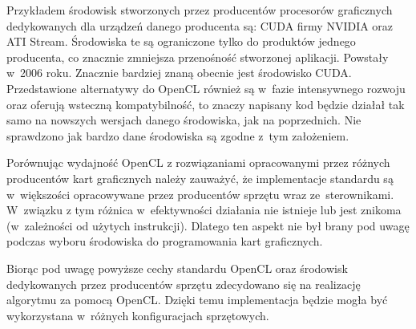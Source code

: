 Przykładem środowisk stworzonych przez producentów procesorów graficznych dedykowanych dla urządzeń danego producenta są: CUDA firmy NVIDIA oraz ATI Stream. Środowiska te są ograniczone tylko do produktów jednego producenta, co znacznie zmniejsza przenośność stworzonej aplikacji. Powstały w~2006 roku. Znacznie bardziej znaną obecnie jest środowisko CUDA. Przedstawione alternatywy do OpenCL również są w~fazie intensywnego rozwoju oraz oferują wsteczną kompatybilność, to znaczy napisany kod będzie działał tak samo na nowszych wersjach danego środowiska, jak na poprzednich. Nie sprawdzono jak bardzo dane środowiska są zgodne z~tym założeniem.

Porównując wydajność OpenCL z rozwiązaniami opracowanymi przez różnych producentów kart graficznych należy zauważyć, że implementacje standardu są w~większości opracowywane przez producentów sprzętu wraz ze~sterownikami. W~związku z tym różnica w~efektywności działania nie istnieje lub jest znikoma (w~zależności od użytych instrukcji)\cite{FromCudaToOpenCL}. Dlatego ten aspekt nie był brany pod uwagę podczas wyboru środowiska do programowania kart graficznych.

Biorąc pod uwagę powyższe cechy standardu OpenCL oraz środowisk dedykowanych przez producentów sprzętu zdecydowano się na realizację algorytmu za pomocą OpenCL. Dzięki temu implementacja będzie mogła być wykorzystana w~różnych konfiguracjach sprzętowych.

